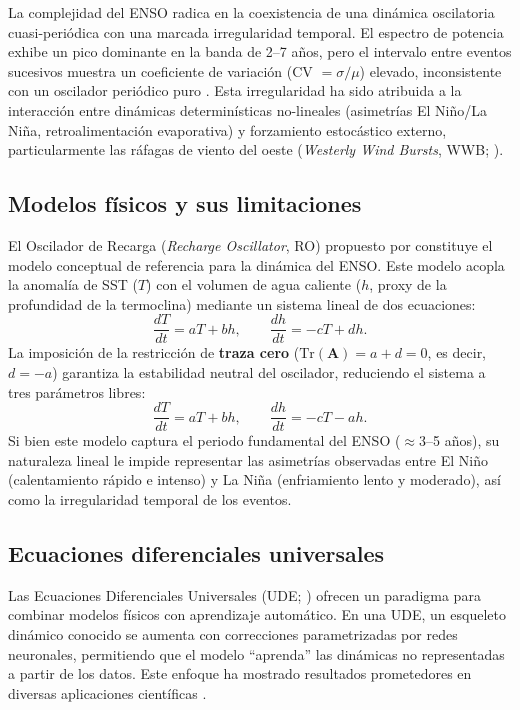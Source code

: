 \documentclass[11pt,a4paper]{article}
\begin{document}
La complejidad del ENSO radica en la coexistencia de una dinámica oscilatoria cuasi-periódica con una marcada irregularidad temporal. El espectro de potencia exhibe un pico dominante en la banda de 2--7 años, pero el intervalo entre eventos sucesivos muestra un coeficiente de variación (CV $= \sigma / \mu$) elevado, inconsistente con un oscilador periódico puro \citep{timmermann2018}. Esta irregularidad ha sido atribuida a la interacción entre dinámicas determinísticas no-lineales (asimetrías El Niño/La Niña, retroalimentación evaporativa) y forzamiento estocástico externo, particularmente las ráfagas de viento del oeste (\textit{Westerly Wind Bursts}, WWB; \citealt{eisenman2005}).

\subsection{Modelos físicos y sus limitaciones}

El Oscilador de Recarga (\textit{Recharge Oscillator}, RO) propuesto por \citet{jin1997} constituye el modelo conceptual de referencia para la dinámica del ENSO. Este modelo acopla la anomalía de SST ($T$) con el volumen de agua caliente ($h$, proxy de la profundidad de la termoclina) mediante un sistema lineal de dos ecuaciones:
\begin{equation}
\label{eq:ro_general}
\frac{dT}{dt} = aT + bh, \qquad
\frac{dh}{dt} = -cT + dh.
\end{equation}
La imposición de la restricción de \textbf{traza cero} ($\mathrm{Tr}(\mathbf{A}) = a + d = 0$, es decir, $d = -a$) garantiza la estabilidad neutral del oscilador, reduciendo el sistema a tres parámetros libres:
\begin{equation}
\label{eq:ro_intro}
\frac{dT}{dt} = aT + bh, \qquad
\frac{dh}{dt} = -cT - ah.
\end{equation}
Si bien este modelo captura el periodo fundamental del ENSO ($\approx 3$--5 años), su naturaleza lineal le impide representar las asimetrías observadas entre El Niño (calentamiento rápido e intenso) y La Niña (enfriamiento lento y moderado), así como la irregularidad temporal de los eventos.

\subsection{Ecuaciones diferenciales universales}

Las Ecuaciones Diferenciales Universales (UDE; \citealt{rackauckas2020}) ofrecen un paradigma para combinar modelos físicos con aprendizaje automático. En una UDE, un esqueleto dinámico conocido se aumenta con correcciones parametrizadas por redes neuronales, permitiendo que el modelo ``aprenda'' las dinámicas no representadas a partir de los datos. Este enfoque ha mostrado resultados prometedores en diversas aplicaciones científicas \citep{chen2018}.
\end{document}
